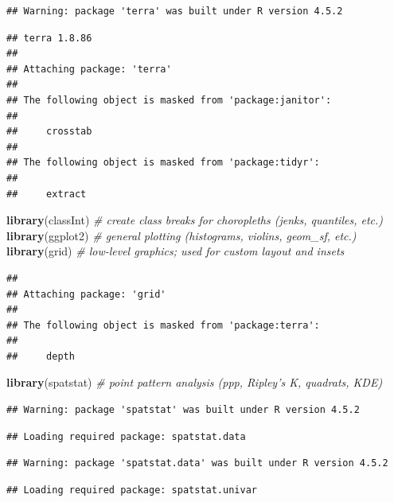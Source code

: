 \documentclass[
]{article}
\newenvironment{Shaded}{\begin{snugshade}}{\end{snugshade}}
\newcommand{\CommentTok}[1]{\textcolor[rgb]{0.56,0.35,0.01}{\textit{#1}}}
\newcommand{\FunctionTok}[1]{\textcolor[rgb]{0.13,0.29,0.53}{\textbf{#1}}}
\newcommand{\NormalTok}[1]{#1}
\begin{document}
\begin{verbatim}
## Warning: package 'terra' was built under R version 4.5.2
\end{verbatim}

\begin{verbatim}
## terra 1.8.86
## 
## Attaching package: 'terra'
## 
## The following object is masked from 'package:janitor':
## 
##     crosstab
## 
## The following object is masked from 'package:tidyr':
## 
##     extract
\end{verbatim}

\begin{Shaded}
\begin{Highlighting}[]
\FunctionTok{library}\NormalTok{(classInt)        }\CommentTok{\# create class breaks for choropleths (jenks, quantiles, etc.)}
\FunctionTok{library}\NormalTok{(ggplot2)         }\CommentTok{\# general plotting (histograms, violins, geom\_sf, etc.)}
\FunctionTok{library}\NormalTok{(grid)            }\CommentTok{\# low{-}level graphics; used for custom layout and insets}
\end{Highlighting}
\end{Shaded}

\begin{verbatim}
## 
## Attaching package: 'grid'
## 
## The following object is masked from 'package:terra':
## 
##     depth
\end{verbatim}

\begin{Shaded}
\begin{Highlighting}[]
\FunctionTok{library}\NormalTok{(spatstat)        }\CommentTok{\# point pattern analysis (ppp, Ripley’s K, quadrats, KDE)}
\end{Highlighting}
\end{Shaded}

\begin{verbatim}
## Warning: package 'spatstat' was built under R version 4.5.2
\end{verbatim}

\begin{verbatim}
## Loading required package: spatstat.data
\end{verbatim}

\begin{verbatim}
## Warning: package 'spatstat.data' was built under R version 4.5.2
\end{verbatim}

\begin{verbatim}
## Loading required package: spatstat.univar
\end{verbatim}
\end{document}
